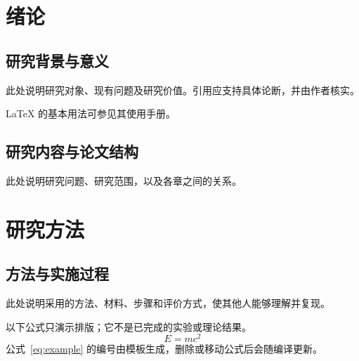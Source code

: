 \section{绪论}
\label{sec:introduction}
\subsection{研究背景与意义}
此处说明研究对象、现有问题及研究价值。引用应支持具体论断，并由作者核实。

LaTeX 的基本用法可参见其使用手册\cite{lamport1994latex}。

\subsection{研究内容与论文结构}
此处说明研究问题、研究范围，以及各章之间的关系。

\section{研究方法}
\label{sec:method}
\subsection{方法与实施过程}
此处说明采用的方法、材料、步骤和评价方式，使其他人能够理解并复现。

以下公式只演示排版；它不是已完成的实验或理论结果。
\begin{equation}
  E = mc^{2}
  \label{eq:example}
\end{equation}
公式~\eqref{eq:example} 的编号由模板生成，删除或移动公式后会随编译更新。

